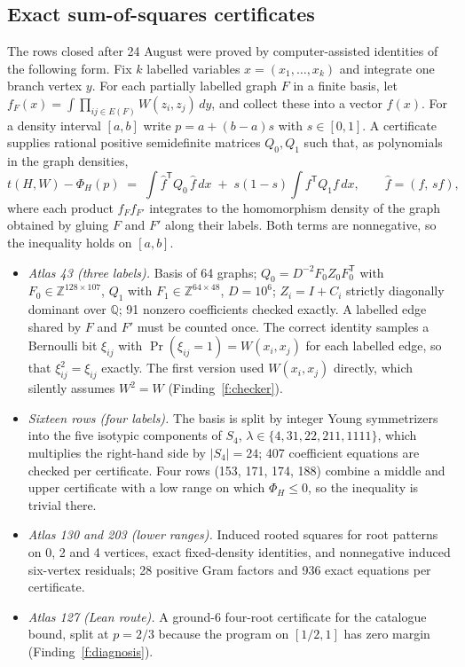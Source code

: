 \documentclass[11pt,a4paper]{article}
\begin{document}
\subsection{Exact sum-of-squares certificates}\label{app:sos}

The rows closed after 24 August were proved by computer-assisted identities of the following form. Fix $k$
labelled variables $x=(x_1,\dots,x_k)$ and integrate one branch vertex $y$. For each partially labelled graph
$F$ in a finite basis, let $f_F(x)=\int\prod_{ij\in E(F)}W(z_i,z_j)\,dy$, and collect these into a vector
$f(x)$. For a density interval $[a,b]$ write $p=a+(b-a)s$ with $s\in[0,1]$. A certificate supplies rational
positive semidefinite matrices $Q_0,Q_1$ such that, as polynomials in the graph densities,
\[
  t(H,W)-\Phi_H(p) \;=\; \int \widehat f^{\mathsf T}Q_0\,\widehat f\,dx \;+\; s(1-s)\int f^{\mathsf T}Q_1 f\,dx,
  \qquad \widehat f=(f,\,s f),
\]
where each product $f_Ff_{F'}$ integrates to the homomorphism density of the graph obtained by gluing $F$ and
$F'$ along their labels. Both terms are nonnegative, so the inequality holds on $[a,b]$.

\begin{itemize}
\item \emph{Atlas 43 (three labels).} Basis of 64 graphs; $Q_0=D^{-2}F_0Z_0F_0^{\mathsf T}$ with $F_0\in\mathbb
  Z^{128\times107}$, $Q_1$ with $F_1\in\mathbb Z^{64\times48}$, $D=10^6$; $Z_i=I+C_i$ strictly diagonally
  dominant over $\mathbb Q$; 91 nonzero coefficients checked exactly. A labelled edge shared by $F$ and $F'$ must
  be counted once. The correct identity samples a Bernoulli bit $\xi_{ij}$ with $\Pr(\xi_{ij}=1)=W(x_i,x_j)$ for
  each labelled edge, so that $\xi_{ij}^2=\xi_{ij}$ exactly. The first version used $W(x_i,x_j)$ directly,
  which silently assumes $W^2=W$ (Finding~\ref{f:checker}).
\item \emph{Sixteen rows (four labels).} The basis is split by integer Young symmetrizers into the five isotypic
  components of $S_4$, $\lambda\in\{4,31,22,211,1111\}$, which multiplies the right-hand side by $|S_4|=24$;
  407 coefficient equations are checked per certificate. Four rows (153, 171, 174, 188) combine a middle and upper
  certificate with a low range on which $\Phi_H\le0$, so the inequality is trivial there.
\item \emph{Atlas 130 and 203 (lower ranges).} Induced rooted squares for root patterns on 0, 2 and 4 vertices,
  exact fixed-density identities, and nonnegative induced six-vertex residuals; 28 positive Gram factors and 936
  exact equations per certificate.
\item \emph{Atlas 127 (Lean route).} A ground-6 four-root certificate for the catalogue bound, split at
  $p=2/3$ because the program on $[1/2,1]$ has zero margin (Finding~\ref{f:diagnosis}).
\end{itemize}
\end{document}
